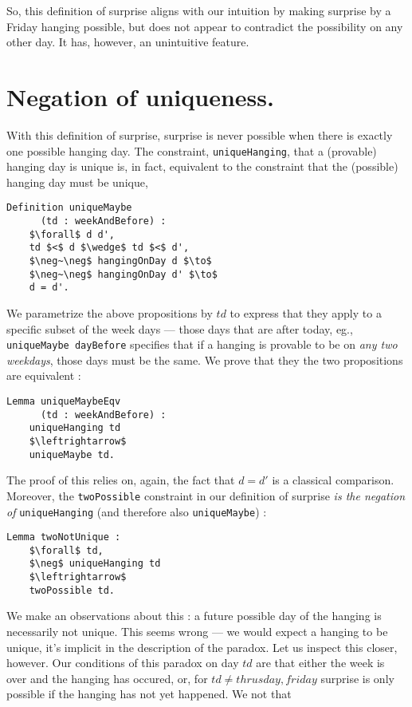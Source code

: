 \documentclass[journal]{journal}
\begin{document}
So, this definition of surprise aligns with our intuition by making surprise
by a Friday hanging possible, but does not appear to contradict the possibility
on any other day. It has, however, an unintuitive feature.

\section{Negation of uniqueness. }
\label{sec:unique}

With this definition of surprise, surprise is never possible when there is
exactly one possible hanging day. The constraint, {\tt uniqueHanging}, that
a (provable) hanging day is unique is, in fact, equivalent to the constraint
that the (possible) hanging day must be unique,

\begin{lstlisting}[mathescape=true]
  Definition uniqueMaybe
      (td : weekAndBefore) :
    $\forall$ d d',
    td $<$ d $\wedge$ td $<$ d',
    $\neg~\neg$ hangingOnDay d $\to$
    $\neg~\neg$ hangingOnDay d' $\to$
    d = d'.
\end{lstlisting}

We parametrize the above propositions by $td$ to express that they apply to
a specific subset of the week days --- those days that are after today,
eg., {\tt uniqueMaybe dayBefore} specifies that if a hanging is provable to be
on \emph{any two weekdays}, those days must be the same.
We prove that they the two propositions are equivalent :

\begin{lstlisting}[mathescape=true]
  Lemma uniqueMaybeEqv
      (td : weekAndBefore) :
    uniqueHanging td
    $\leftrightarrow$
    uniqueMaybe td.
\end{lstlisting}

The proof of this relies on, again, the fact that $d = d'$ is a classical
comparison. Moreover, the {\tt twoPossible} constraint
in our definition of surprise \emph{is the negation of} {\tt uniqueHanging}
(and therefore also {\tt uniqueMaybe}) :

\begin{lstlisting}[mathescape=true]
  Lemma twoNotUnique :
    $\forall$ td,
    $\neg$ uniqueHanging td
    $\leftrightarrow$
    twoPossible td.
\end{lstlisting}

We make an observations about this : a future possible day of the hanging is
necessarily not unique. This seems wrong --- we would expect a hanging to be
unique, it's implicit in the
description of the paradox. Let us inspect this closer, however.
Our conditions of this paradox on day $td$ are that either
the week is over and the hanging has occured, or, for $td \neq thrusday, friday$ surprise is
only possible if the hanging has not yet happened. We not that
\end{document}
